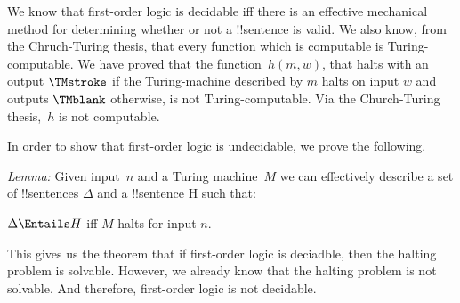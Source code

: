 \documentclass[../../../include/open-logic-section]{subfiles}
\begin{document}

\begin{explain}
We know that first-order logic is decidable iff there is an effective mechanical
method for determining whether or not a !!{sentence} is valid. We also know, from
the Chruch-Turing thesis, that every function which is computable is 
Turing-computable. We have proved that the function~$h(m,w)$, that halts with
an output $\TMstroke$ if the Turing-machine described by $m$ halts on input $w$ 
and outputs $\TMblank$ otherwise, is not Turing-computable. Via the Church-Turing
thesis,~$h$ is not computable. 

In order to show that first-order logic is undecidable, we prove the following.

\emph{Lemma:} Given input~$n$ and a Turing machine~$M$ we can effectively 
describe a set of !!{sentence}s $\Delta$ and a !!{sentence} H such that:

$\Delta \Entails H$ iff $M$ halts for input $n$.
\end{explain}

This gives us the theorem that if first-order logic is deciadble, then the halting problem
is solvable. However, we already know that the halting problem is not solvable. And
therefore, first-order logic is not decidable.
\end{document}

